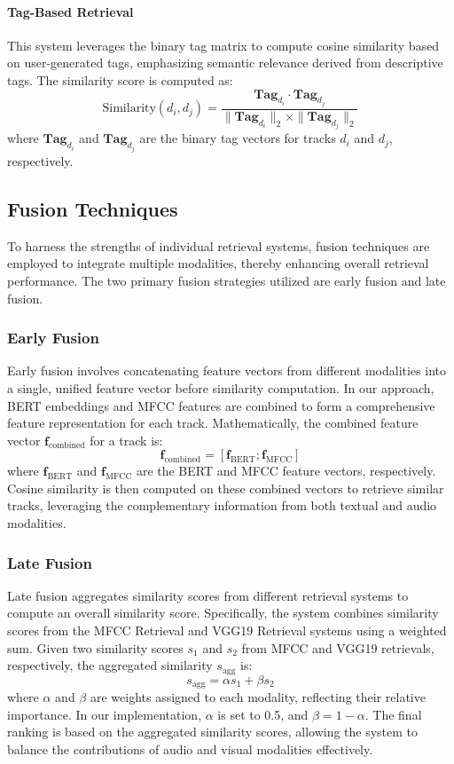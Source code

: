 \documentclass[sigconf]{acmart}
\begin{document}
\paragraph{Tag-Based Retrieval}
This system leverages the binary tag matrix to compute cosine similarity based on user-generated tags, emphasizing semantic relevance derived from descriptive tags. The similarity score is computed as:
\[
\text{Similarity}(d_i, d_j) = \frac{\mathbf{Tag}_{d_i} \cdot \mathbf{Tag}_{d_j}}{\|\mathbf{Tag}_{d_i}\|_2 \times \|\mathbf{Tag}_{d_j}\|_2}
\]
where \( \mathbf{Tag}_{d_i} \) and \( \mathbf{Tag}_{d_j} \) are the binary tag vectors for tracks \( d_i \) and \( d_j \), respectively.

\subsection{Fusion Techniques}
\label{subsec:fusion_techniques}

To harness the strengths of individual retrieval systems, fusion techniques are employed to integrate multiple modalities, thereby enhancing overall retrieval performance. The two primary fusion strategies utilized are early fusion and late fusion.

\subsubsection{Early Fusion}

Early fusion involves concatenating feature vectors from different modalities into a single, unified feature vector before similarity computation. In our approach, BERT embeddings and MFCC features are combined to form a comprehensive feature representation for each track. Mathematically, the combined feature vector \( \mathbf{f}_{\text{combined}} \) for a track is:
\[
\mathbf{f}_{\text{combined}} = [\mathbf{f}_{\text{BERT}}; \mathbf{f}_{\text{MFCC}}]
\]
where \( \mathbf{f}_{\text{BERT}} \) and \( \mathbf{f}_{\text{MFCC}} \) are the BERT and MFCC feature vectors, respectively. Cosine similarity is then computed on these combined vectors to retrieve similar tracks, leveraging the complementary information from both textual and audio modalities.

\subsubsection{Late Fusion}

Late fusion aggregates similarity scores from different retrieval systems to compute an overall similarity score. Specifically, the system combines similarity scores from the MFCC Retrieval and VGG19 Retrieval systems using a weighted sum. Given two similarity scores \( s_1 \) and \( s_2 \) from MFCC and VGG19 retrievals, respectively, the aggregated similarity \( s_{\text{agg}} \) is:
\[
s_{\text{agg}} = \alpha s_1 + \beta s_2
\]
where \( \alpha \) and \( \beta \) are weights assigned to each modality, reflecting their relative importance. In our implementation, \( \alpha \) is set to 0.5, and \( \beta = 1 - \alpha \). The final ranking is based on the aggregated similarity scores, allowing the system to balance the contributions of audio and visual modalities effectively.
\end{document}
